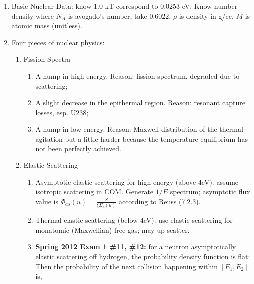 \documentclass{school-22.211-notes}
\date{March 14, 2012}
\begin{document}
\maketitle

\begin{enumerate}
\item Basic Nuclear Data: know 1.0 kT correspond to 0.0253 eV. Know number density 
  where $N_A$ is  avogado's number, take $0.6022$, $\rho$ is density in g/cc, $M$ is atomic mass (unitless). 

\item Four pieces of nuclear physics: 
  \begin{enumerate}
    \item Fission Spectra    
      \begin{enumerate}
      \item A hump in high energy. Reason: fission spectrum, degraded due to scattering; 
      \item A slight decrease in the epithermal region. Reason: resonant capture losses, esp. U238; 
      \item A hump in low energy. Reason: Maxwell distribution of the thermal agitation but a little harder because the temperature equilibrium has not been perfectly achieved. 
      \end{enumerate}

    \item Elastic Scattering
      \begin{enumerate}
      \item Asymptotic elastic scattering for high energy (above 4eV): assume isotropic scattering in COM. Generate $1/E$ spectrum; asymptotic flux value is $\Phi_{as} (u) = \frac{S}{\xi \Sigma_s (u)}$ according to Reuss (7.2.3). 
      \item Thermal elastic scattering (below 4eV): use elastic scattering for monatomic (Maxwellian) free gas; may up-scatter. 
      \item  \textbf{Spring 2012 Exam 1 \#11, \#12:} for a neutron asymptotically elastic scattering off hydrogen, the probability density function is flat: 
        Then the probability of the next collision happening within $[E_1,E_2]$ is, 
      \end{enumerate}


\end{enumerate}
\end{enumerate}
\end{document}
